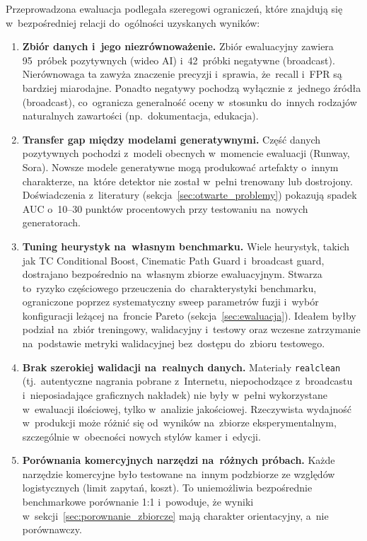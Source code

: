 Przeprowadzona ewaluacja podlegała szeregowi ograniczeń, które znajdują się w~bezpośredniej relacji
do~ogólności uzyskanych wyników:

\begin{enumerate}

  \item \textbf{Zbiór danych i~jego niezrównoważenie.}
    Zbiór ewaluacyjny zawiera 95~próbek pozytywnych (wideo AI) i~42~próbki negatywne (broadcast).
    Nierównowaga ta zawyża znaczenie precyzji i~sprawia, że~recall i~FPR są bardziej miarodajne.
    Ponadto negatywy pochodzą wyłącznie z~jednego źródła (broadcast), co~ogranicza generalność
    oceny w~stosunku do~innych rodzajów naturalnych zawartości (np.\ dokumentacja, edukacja).

  \item \textbf{Transfer gap między modelami generatywnymi.}
    Część danych pozytywnych pochodzi z~modeli obecnych w~momencie ewaluacji (Runway, Sora).
    Nowsze modele generatywne mogą produkować artefakty o~innym charakterze, na~które
    detektor nie został w~pełni trenowany lub dostrojony. Doświadczenia z~literatury
    (sekcja~\ref{sec:otwarte_problemy}) pokazują spadek AUC o~10--30 punktów procentowych
    przy testowaniu na~nowych generatorach.

  \item \textbf{Tuning heurystyk na~własnym benchmarku.}
    Wiele heurystyk, takich jak TC Conditional Boost, Cinematic Path Guard
    i~broadcast guard, dostrajano bezpośrednio na~własnym zbiorze ewaluacyjnym.
    Stwarza to~ryzyko częściowego przeuczenia do~charakterystyki benchmarku,
    ograniczone poprzez systematyczny sweep parametrów fuzji i~wybór konfiguracji
    leżącej na~froncie Pareto (sekcja~\ref{sec:ewaluacja}).
    Ideałem byłby podział na~zbiór treningowy, walidacyjny i~testowy oraz
    wczesne zatrzymanie na~podstawie metryki walidacyjnej bez~dostępu do~zbioru testowego.

  \item \textbf{Brak szerokiej walidacji na~realnych danych.}
    Materiały \texttt{realclean} (tj.\ autentyczne nagrania pobrane z~Internetu, niepochodzące z~broadcastu i~nieposiadające graficznych nakładek)
    nie były w~pełni wykorzystane w~ewaluacji ilościowej, tylko w~analizie jakościowej.
    Rzeczywista wydajność w~produkcji może różnić się od~wyników na~zbiorze
    eksperymentalnym, szczególnie w~obecności nowych stylów kamer i~edycji.

  \item \textbf{Porównania komercyjnych narzędzi na~różnych próbach.}
    Każde narzędzie komercyjne było testowane na~innym podzbiorze ze względów logistycznych
    (limit zapytań, koszt). To uniemożliwia bezpośrednie benchmarkowe porównanie 1:1
    i~powoduje, że wyniki w~sekcji~\ref{sec:porownanie_zbiorcze}
    mają charakter orientacyjny, a~nie porównawczy.


\end{enumerate}
